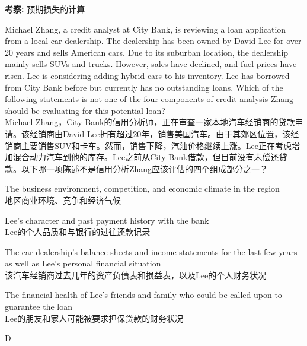 \documentclass{article}
\newcounter{question} %
\newcommand{\checklist}[1]{
    \textbf{考察:} #1 \par %
    \addcontentsline{toc}{subsection}{题号\thequestion 考察: #1} %
    \vspace{2em} %
}
\begin{document}
\checklist{预期损失的计算}

\begin{question}
    Michael Zhang, a credit analyst at City Bank, is reviewing a loan application from a local car dealership. The dealership has been owned by David Lee for over 20 years and sells American cars. Due to its suburban location, the dealership mainly sells SUVs and trucks. However, sales have declined, and fuel prices have risen. Lee is considering adding hybrid cars to his inventory. Lee has borrowed from City Bank before but currently has no outstanding loans. Which of the following statements is not one of the four components of credit analysis Zhang should be evaluating for this potential loan?
    \\ Michael Zhang，City Bank的信用分析师，正在审查一家本地汽车经销商的贷款申请。该经销商由David Lee拥有超过20年，销售美国汽车。由于其郊区位置，该经销商主要销售SUV和卡车。然而，销售下降，汽油价格继续上涨。Lee正在考虑增加混合动力汽车到他的库存。Lee之前从City Bank借款，但目前没有未偿还贷款。以下哪一项陈述不是信用分析Zhang应该评估的四个组成部分之一？
\end{question}

\begin{choices}
    \item The business environment, competition, and economic climate in the region\\
    地区商业环境、竞争和经济气候
    \item Lee's character and past payment history with the bank\\
    Lee的个人品质和与银行的过往还款记录
    \item The car dealership's balance sheets and income statements for the last few years as well as Lee's personal financial situation\\
    该汽车经销商过去几年的资产负债表和损益表，以及Lee的个人财务状况
    \item The financial health of Lee's friends and family who could be called upon to guarantee the loan\\
    Lee的朋友和家人可能被要求担保贷款的财务状况
\end{choices}

\begin{correctanswer}
    D
\end{correctanswer}
\end{document}

